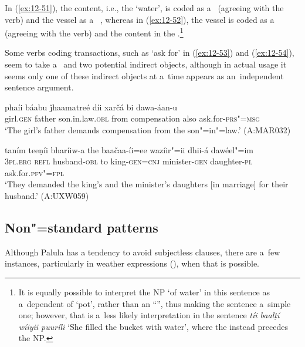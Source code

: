 In (\ref{ex:12-51}), the content, i.e., the `water', is coded as a~ (agreeing with the  verb) and the vessel as a~ , whereas in (\ref{ex:12-52}), the vessel is coded as a~ (agreeing with the  verb) and the content in the .\footnote{It is equally possible to interpret the  NP `of water' in this sentence as a~dependent of `pot', rather than an ``'', thus making the sentence a~simple  one; however, that is a~less likely interpretation in the sentence \textit{tíi baalṭí wíiyii puuríli} `She filled the bucket with water', where the  instead precedes the  NP.} 


Some verbs coding transactions, such as `ask for' in (\ref{ex:12-53}) and (\ref{ex:12-54}), seem to take a~ and two potential indirect objects, although in actual usage it seems only one of these indirect objects at a~time appears as an~independent sentence argument. 

\begin{exe}
\ex
\label{ex:12-53}
\gll phaíi báabu ǰhaamatreé díi xarčá bi dawa-áan-u \\
girl.\textsc{gen} father son.in.law.\textsc{obl} from compensation also ask.for-\textsc{prs"=msg} \\
\glt `The girl's father demands compensation from the son"=in"=law.' (A:MAR032)
\end{exe}
\begin{exe}
\ex
\label{ex:12-54}
\gll taním teeṇíi bharíiw-a the baačaa-íi=ee wazíir"=ii dhii-á dawéel"=im \\
3\textsc{pl.erg} \textsc{refl} husband-\textsc{obl} to king-\textsc{gen=cnj}  minister-\textsc{gen} daughter-\textsc{pl} ask.for.\textsc{pfv"=fpl}\\
\glt `They demanded the king's and the minister's daughters [in marriage] for their husband.' (A:UXW059)
\end{exe}

\subsection{Non"=standard  patterns}
\label{subsec:12-2-6}

 Although Palula  has a tendency to avoid subjectless clauses, there are a~few instances, particularly in weather expressions (), when that is possible.


